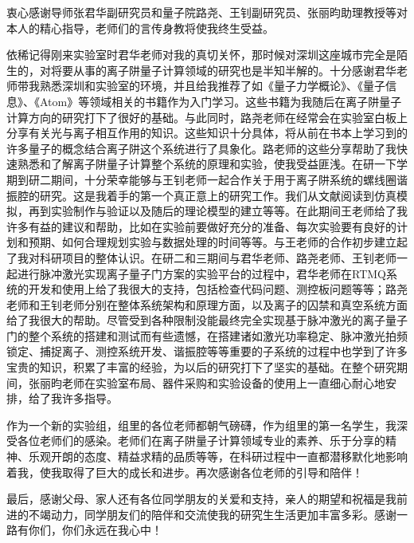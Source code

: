 
\begin{acknowledgements}
  衷心感谢导师张君华副研究员和量子院路尧、王钊副研究员、张丽昀助理教授等对本人的精心指导，老师们的言传身教将使我终生受益。

  依稀记得刚来实验室时君华老师对我的真切关怀，那时候对深圳这座城市完全是陌生的，对将要从事的离子阱量子计算领域的研究也是半知半解的。十分感谢君华老师带我熟悉深圳和实验室的环境，并且给我推荐了如《量子力学概论》、《量子信息》、《Atom》等领域相关的书籍作为入门学习。这些书籍为我随后在离子阱量子计算方向的研究打下了很好的基础。与此同时，路尧老师在经常会在实验室白板上分享有关光与离子相互作用的知识。这些知识十分具体，将从前在书本上学习到的许多量子的概念结合离子阱这个系统进行了具象化。路老师的这些分享帮助了我快速熟悉和了解离子阱量子计算整个系统的原理和实验，使我受益匪浅。在研一下学期到研二期间，十分荣幸能够与王钊老师一起合作关于用于离子阱系统的螺线圈谐振腔的研究。这是我着手的第一个真正意上的研究工作。我们从文献阅读到仿真模拟，再到实验制作与验证以及随后的理论模型的建立等等。在此期间王老师给了我许多有益的建议和帮助，比如在实验前要做好充分的准备、每次实验要有良好的计划和预期、如何合理规划实验与数据处理的时间等等。与王老师的合作初步建立起了我对科研项目的整体认识。在研二和三期间与君华老师、路尧老师、王钊老师一起进行脉冲激光实现离子量子门方案的实验平台的过程中，君华老师在RTMQ系统的开发和使用上给了我很大的支持，包括检查代码问题、测控板问题等等；路尧老师和王钊老师分别在整体系统架构和原理方面，以及离子的囚禁和真空系统方面给了我很大的帮助。尽管受到各种限制没能最终完全实现基于脉冲激光的离子量子门的整个系统的搭建和测试而有些遗憾，在搭建诸如激光功率稳定、脉冲激光拍频锁定、捕捉离子、测控系统开发、谐振腔等等重要的子系统的过程中也学到了许多宝贵的知识，积累了丰富的经验，为以后的研究打下了坚实的基础。在整个研究期间，张丽昀老师在实验室布局、器件采购和实验设备的使用上一直细心耐心地安排，给了我许多指导。
  
  作为一个新的实验组，组里的各位老师都朝气磅礴，作为组里的第一名学生，我深受各位老师们的感染。老师们在离子阱量子计算领域专业的素养、乐于分享的精神、乐观开朗的态度、精益求精的品质等等，在科研过程中一直都潜移默化地影响着我，使我取得了巨大的成长和进步。再次感谢各位老师的引导和陪伴！



  最后，感谢父母、家人还有各位同学朋友的关爱和支持，亲人的期望和祝福是我前进的不竭动力，同学朋友们的陪伴和交流使我的研究生生活更加丰富多彩。感谢一路有你们，你们永远在我心中！

\end{acknowledgements}
